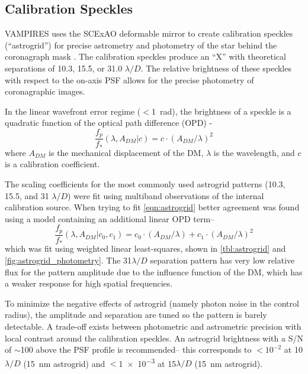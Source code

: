 \subsection{Calibration Speckles}\label{sec:astrogrid}

VAMPIRES uses the SCExAO deformable mirror to create calibration speckles (``astrogrid'') for precise astrometry and photometry of the star behind the coronagraph mask \citep{sahoo_precision_2020}. The calibration speckles produce an ``X'' with theoretical separations of 10.3, 15.5, or 31.0 $\lambda/D$. The relative brightness of these speckles with respect to the on-axis PSF allows for the precise photometry of coronagraphic images.

In the linear wavefront error regime ($<$\SI{1}{\radian}), the brightness of a speckle is a quadratic function of the optical path difference (OPD) \citep{sahoo_precision_2020,chen_post-processing_2023,follette_introduction_2023}-
\begin{equation}
    \label{eqn:astrogrid}
    \frac{f_p}{f_*}\left( \lambda, A_{DM} | c \right) = c \cdot \left(A_{DM} / \lambda\right)^2
\end{equation}
where $A_{DM}$ is the mechanical displacement of the DM, $\lambda$ is the wavelength, and $c$ is a calibration coefficient. 

The scaling coefficients for the most commonly used astrogrid patterns (10.3, 15.5, and 31 $\lambda/D$) were fit using multiband observations of the internal calibration source. When trying to fit \autoref{eqn:astrogrid} better agreement was found using a model containing an additional linear OPD term--
\begin{equation}
    \label{eqn:astrogridmod}
    \frac{f_p}{f_*}\left( \lambda, A_{DM} | c_0, c_1 \right) = c_0 \cdot \left(A_{DM} / \lambda\right) + c_1 \cdot \left(A_{DM} / \lambda\right)^2
\end{equation}
which was fit using weighted linear least-squares, shown in \autoref{tbl:astrogrid} and \autoref{fig:astrogrid_photometry}. The 31$\lambda/D$ separation pattern has very low relative flux for the pattern amplitude due to the influence function of the DM, which has a weaker response for high spatial frequencies.

To minimize the negative effects of astrogrid (namely photon noise in the control radius), the amplitude and separation are tuned so the pattern is barely detectable. A trade-off exists between photometric and astrometric precision with local contrast around the calibration speckles. An astrogrid brightness with a S/N of $\sim$100 above the PSF profile is recommended-- this corresponds to $<10^{-2}$ at 10$\lambda/D$ (\SI{15}{\nano\meter} astrogrid) and $<$\num{1e-3} at 15$\lambda/D$ (\SI{15}{\nano\meter} astrogrid).

